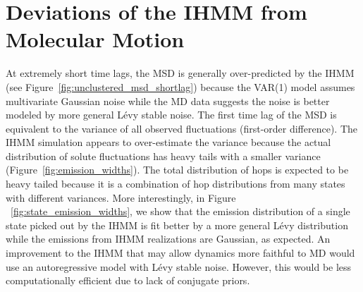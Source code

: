 \documentclass{article}
\begin{document}
  

  \section{Deviations of the IHMM from Molecular Motion}\label{section:shorttimes_msd}
  
   At extremely short time lags, the MSD is generally over-predicted by the IHMM
  (see Figure~\ref{fig:unclustered_msd_shortlag}) because the VAR(1) model assumes
  multivariate Gaussian noise while the MD data suggests the noise is better 
  modeled by more general L\'evy stable noise. The first time lag of the MSD is
  equivalent to the variance of all observed fluctuations (first-order difference). 
  The IHMM simulation appears to over-estimate the variance because the actual 
  distribution of solute fluctuations has heavy tails with a smaller variance (Figure~\ref{fig:emission_widths}).
  The total distribution of hops is expected to be heavy tailed because it is a
  combination of hop distributions from many states with different variances. More
  interestingly, in Figure ~\ref{fig:state_emission_widths}, we show that the 
  emission distribution of a single state picked out by the IHMM is fit better by
  a more general L\'evy distribution while the emissions from IHMM realizations are
  Gaussian, as expected. An improvement to the IHMM that may allow dynamics more 
  faithful to MD would use an autoregressive model with L\'evy stable noise. However,
  this would be less computationally efficient due to lack of conjugate priors.
  
\end{document}
